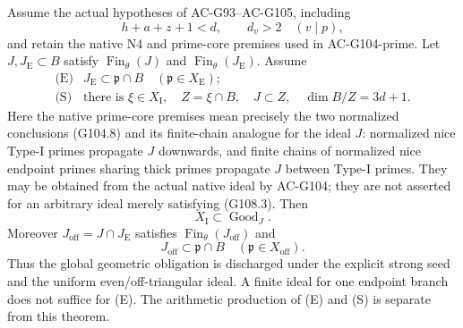 \begin{theorem}
\label{AC-G108-propagation}
Assume the actual hypotheses of AC-G93--AC-G105, including
\[
 h+a+z+1<d,\qquad d_v>2\quad(v\mid p),
 \tag{G108.8}
\]
and retain the native N4 and prime-core premises used in
AC-G104-prime.  Let $J,J_{\mathrm E}\subset B$ satisfy
$\operatorname{Fin}_{\theta}(J)$ and
$\operatorname{Fin}_{\theta}(J_{\mathrm E})$.  Assume
\[
 \begin{array}{ll}
 \text{(E)}&J_{\mathrm E}\subset\mathfrak p\cap B
                   \quad(\mathfrak p\in X_{\mathrm E});\\
 \text{(S)}&\text{there is }\xi\in X_{\mathrm I},\quad
        Z=\xi\cap B,\quad J\subset Z,\quad\dim B/Z=3d+1.
 \end{array}
 \tag{G108.9}
\]
Here the native prime-core premises mean precisely the two
normalized conclusions (G104.8) and its finite-chain analogue
for the ideal $J$: normalized nice Type-I primes propagate
$J$ downwards, and finite chains of normalized nice endpoint
primes sharing thick primes propagate $J$ between Type-I primes.
They may be obtained from the actual native ideal by AC-G104;
they are not asserted for an arbitrary ideal merely satisfying
(G108.3).
Then
\[
 X_{\mathrm I}\subset\operatorname{Good}_J.
 \tag{G108.10}
\]
Moreover $J_{\mathrm{off}}=J\cap J_{\mathrm E}$ satisfies
$\operatorname{Fin}_{\theta}(J_{\mathrm{off}})$ and
\[
 J_{\mathrm{off}}\subset\mathfrak p\cap B
                 \quad(\mathfrak p\in X_{\mathrm{off}}).
 \tag{G108.11}
\]
Thus the global geometric obligation is discharged under the
explicit strong seed and the uniform even/off-triangular ideal.
A finite ideal for one endpoint branch does not suffice for (E).
The arithmetic production of (E) and (S) is separate from this theorem.
\end{theorem}

